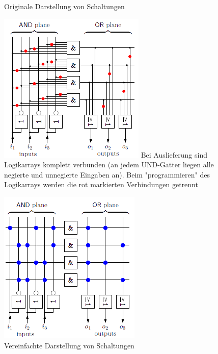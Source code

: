 \documentclass[12pt]{report}
\begin{document}
\begin{figure}[h]
  \begin{minipage}[t]{0.45\textwidth}
    \caption{Originale Darstellung von Schaltungen}
    \includegraphics[height=\textwidth]{../graphics/PLA_implementation.png}
    Bei Auslieferung sind Logikarrays komplett verbunden (an jedem UND-Gatter liegen alle negierte und unnegierte Eingaben an).
    Beim "programmieren" des Logikarrays werden die rot markierten Verbindungen getrennt
  \end{minipage}
  \hfill
  \begin{minipage}[t]{0.45\textwidth}
    \caption{Vereinfachte Darstellung von Schaltungen}
    \includegraphics[height=\textwidth]{../graphics/PLA_implementation_simplification.png}

\end{minipage}
\end{figure}
\end{document}
